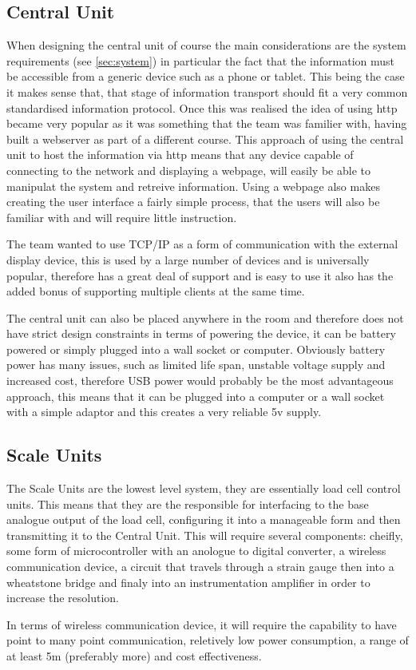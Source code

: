 \subsection{Central Unit}
\label{central design}
When designing the central unit of course the main considerations are the system requirements (see \ref{sec:system}) in particular the fact that the information must be accessible from a generic device such as a phone or tablet. This being the case it makes sense that, that stage of information transport should fit a very common standardised information protocol. Once this was realised the idea of using http became very popular as it was something that the team was familier with, having built a webserver as part of a different course. This approach of using the central unit to host the information via http means that any device capable of connecting to the network and displaying a webpage, will easily be able to manipulat the system and retreive information. Using a webpage also makes creating the user interface a fairly simple process, that the users will also be familiar with and will require little instruction. 

The team wanted to use TCP/IP as a form of communication with the external display device, this is used by a large number of devices and is universally popular, therefore has a great deal of support and is easy to use it also has the added bonus of supporting multiple clients at the same time. 


The central unit can also be placed anywhere in the room and therefore does not have strict design constraints  in terms of powering the device, it can be battery powered or simply plugged into a wall socket or computer. Obviously battery power has many issues, such as limited life span, unstable voltage supply and increased cost, therefore USB power would probably be the most advantageous approach, this means that it can be plugged into a computer or a wall socket with a simple adaptor and this creates a very reliable 5v supply.

\subsection{Scale Units}
The Scale Units are the lowest level system, they are essentially load cell control units. This means that they are the responsible for interfacing to the base analogue output of the load cell, configuring it into a manageable form and then transmitting it to the Central Unit. This will require several components: cheifly, some form of microcontroller with an anologue to digital converter, a wireless communication device, a circuit that travels through a strain gauge then into a wheatstone bridge and finaly into an instrumentation amplifier in order to increase the resolution. 

In terms of wireless communication device, it will require the capability to have point to many point communication, reletively low power consumption, a range of at least 5m (preferably more) and cost effectiveness.

